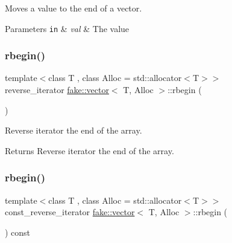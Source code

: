 Moves a value to the end of a vector. 


\begin{DoxyParams}[1]{Parameters}
\mbox{\tt in}  & {\em val} & The value \\
\hline
\end{DoxyParams}
\mbox{\label{classfake_1_1vector_a7b2476e1382bbf1ce2d799122f62b06b}} 
\subsubsection{\texorpdfstring{rbegin()}{rbegin()}\hspace{0.1cm}{\footnotesize\ttfamily [1/2]}}
{\footnotesize\ttfamily template$<$class T , class Alloc  = std\+::allocator$<$\+T$>$$>$ \\
reverse\+\_\+iterator \mbox{\hyperlink{classfake_1_1vector}{fake\+::vector}}$<$ T, Alloc $>$\+::rbegin (\begin{DoxyParamCaption}{ }\end{DoxyParamCaption})\hspace{0.3cm}{\ttfamily [inline]}}



Reverse iterator the end of the array. 

\begin{DoxyReturn}{Returns}
Reverse iterator the end of the array. 
\end{DoxyReturn}
\mbox{\label{classfake_1_1vector_ab66c5a88df51f894685fde8dc6c033b5}} 
\subsubsection{\texorpdfstring{rbegin()}{rbegin()}\hspace{0.1cm}{\footnotesize\ttfamily [2/2]}}
{\footnotesize\ttfamily template$<$class T , class Alloc  = std\+::allocator$<$\+T$>$$>$ \\
const\+\_\+reverse\+\_\+iterator \mbox{\hyperlink{classfake_1_1vector}{fake\+::vector}}$<$ T, Alloc $>$\+::rbegin (\begin{DoxyParamCaption}{ }\end{DoxyParamCaption}) const\hspace{0.3cm}{\ttfamily [inline]}}



